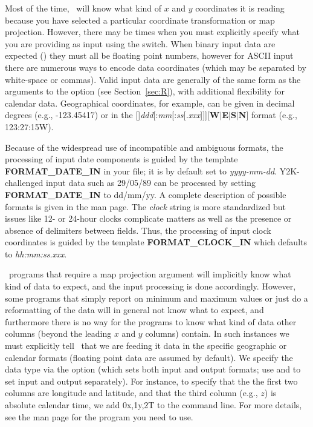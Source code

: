 Most of the time, \GMT\ will know what kind of $x$ and $y$ coordinates it is reading because you have selected
a particular coordinate transformation or map projection.  However,
there may be times when you must explicitly specify what you are
providing as input using the  switch. When binary input data are expected () they must all
be floating point numbers, however for ASCII input there are numerous
ways to encode data coordinates (which may be separated by white-space or commas).  Valid input data are generally
of the same form as the arguments to the  option (see Section~\ref{sec:R}), with additional
flexibility for calendar data.  Geographical coordinates, for example, can be given in decimal degrees
(e.g., -123.45417) or in the
[\PM]\emph{ddd}[:\emph{mm}[:\emph{ss}[\emph{.xxx}]]][\textbf{W}$|$\textbf{E}$|$\textbf{S}$|$\textbf{N}]
format (e.g., 123:27:15W).

Because of the widespread use of incompatible and ambiguous formats, the processing of input
date components is guided by the template \textbf{FORMAT\_DATE\_IN} in your
 file; it is by default set to \emph{yyyy-mm-dd}.  Y2K-challenged input data such as
29/05/89 can be processed by setting \textbf{FORMAT\_DATE\_IN}
to dd/mm/yy.  A complete description of possible formats is given in the 
man page.  The \emph{clock} string is more standardized but issues like 12- or 24-hour clocks complicate matters
as well as the presence or absence of delimiters between fields.  Thus, the processing of input
clock coordinates is guided by the template \textbf{FORMAT\_CLOCK\_IN} which defaults to \emph{hh:mm:ss.xxx}.

\GMT\ programs that require a map projection argument will implicitly know what kind of data to expect, and the
input processing is done accordingly.  However, some programs that simply report on minimum and maximum
values or just do a reformatting of the data will in general not know what to expect, and furthermore there is
no way for the programs to know what kind of data other columns (beyond the leading $x$ and $y$ columns) contain.
In such instances we must
explicitly tell \GMT\ that we are feeding it data in the specific geographic or calendar formats (floating point
data are assumed by default).  We specify the data type via the  option (which sets both input and output
formats; use  and  to set input and output separately).  For instance, to specify that the
the first two columns are longitude and latitude, and that the third column (e.g., $z$) is absolute calendar time, we add
0x,1y,2T to the command line.  For more details, see the man page for the program you need to use.

